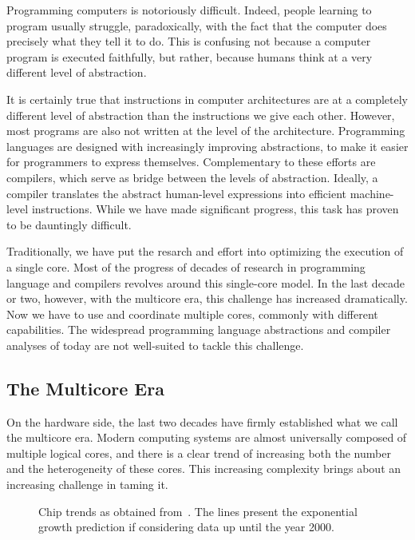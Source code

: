 Programming computers is notoriously difficult.
Indeed, people learning to program usually struggle, paradoxically, with the fact that the computer does precisely what they tell it to do. 
This is confusing not because a computer program is executed faithfully, but rather, because humans think at a very different level of abstraction.

It is certainly true that instructions in computer architectures are at a completely different level of abstraction than the instructions we give each other.
However, most programs are also not written at the level of the architecture.
Programming languages are designed with increasingly improving abstractions, to make it easier for programmers to express themselves.
Complementary to these efforts are compilers, which serve as bridge between the levels of abstraction.
Ideally, a compiler translates the abstract human-level expressions into efficient machine-level instructions.
While we have made significant progress, this task has proven to be dauntingly difficult.

Traditionally, we have put the resarch and effort into optimizing the execution of a single core.
Most of the progress of decades of research in programming language and compilers revolves around this single-core model.
In the last decade or two, however, with the multicore era, this challenge has increased dramatically.
Now we have to use and coordinate multiple cores, commonly with different capabilities.
The widespread programming language abstractions and compiler analyses of today are not well-suited to tackle this challenge.

\subsection{The Multicore Era}

On the hardware side, the last two decades have firmly established what we call the multicore era.
Modern computing systems are almost universally composed of multiple logical cores, and there is a clear trend of increasing both the number and the heterogeneity of these cores.
This increasing complexity brings about an increasing challenge in taming it.

\begin{figure}[h]
	\centering
   \resizebox{0.9\textwidth}{!}{}
   \caption{Chip trends as obtained from~\cite{chiptrends}. The lines present the exponential growth prediction if considering data up until the year 2000.}
	\label{fig:multicore_era}
\end{figure}


